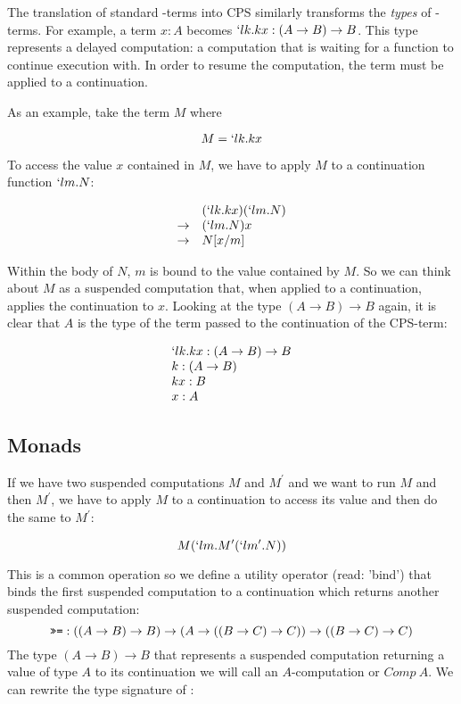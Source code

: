   The translation of standard \lam-terms into CPS similarly transforms the 
  \emph{types} of \lam-terms. For example, a term $x : A$ becomes 
  $`lk.kx : (A \to B) \to B$. This type represents a delayed computation:
  a computation that is waiting for a function to continue execution with. 
  In order to resume the computation, the term must be applied to a 
  continuation.
  
  As an example, take the term $M$ where
  
  \[
    M = `lk.kx
  \]

  To access the value $x$ contained in $M$, we have to apply $M$ to a
  continuation function $`lm.N$:
  
  \[
  \begin{array}{rl}
      & (`lk.kx)(`lm.N) \\
      \to & (`lm.N)x \\
      \to & N[x/m]
  \end{array}
  \]
  
  Within the body of $N$, $m$ is bound to the value contained by $M$.
  So we can think about $M$ as a suspended computation that, when applied
  to a continuation, applies the continuation to $x$. Looking at
  the type $(A \to B) \to B$ again, it is clear that $A$ is the type
  of the term passed to the continuation of the CPS-term:
  
  \[
  \begin{array}{l}
    `lk.kx : (A \to B) \to B \\
    k : (A \to B) \\
    kx : B \\
    x : A \\
  \end{array} 
  \]
  
 
  \subsection{Monads}
  
  If we have two suspended computations $M$ and $M^\prime$ and we want to
  run $M$ and then $M^\prime$, we have to apply $M$ to a continuation
  to access its value and then do the same to $M^\prime$:
  
  \[
    M(`lm.M^\prime(`lm^\prime.N))
  \]
  
  This is a common operation so we define a utility operator \mono{>>=} 
    (read: 'bind') 
  that binds the first suspended computation to a continuation which returns another suspended computation:
  \[
    \texttt{>>=} : ((A \to B) \to B) \to (A \to ((B \to C) \to C)) \to ((B \to C) \to C)
  \]
  The type $(A \to B) \to B$ that represents a suspended computation returning
  a value of type $A$ to its continuation we will call an $A$-computation or
  $Comp\ A$. We can rewrite the type signature of \mono{>>=}:
  
